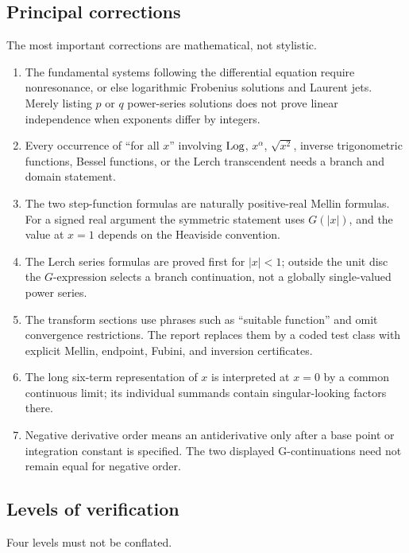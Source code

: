 \subsection{Principal corrections}

The most important corrections are mathematical, not stylistic.

\begin{enumerate}
\item The fundamental systems following the differential equation require
nonresonance, or else logarithmic Frobenius solutions and Laurent jets.  Merely
listing $p$ or $q$ power-series solutions does not prove linear independence
when exponents differ by integers.
\item Every occurrence of ``for all $x$'' involving $\operatorname{Log}$, $x^\alpha$,
$\sqrt{x^2}$, inverse trigonometric functions, Bessel functions, or the Lerch
transcendent needs a branch and domain statement.
\item The two step-function formulas are naturally positive-real Mellin
formulas.  For a signed real argument the symmetric statement uses $G(|x|)$,
and the value at $x=1$ depends on the Heaviside convention.
\item The Lerch series formulas are proved first for $|x|<1$; outside the unit
disc the $G$-expression selects a branch continuation, not a globally
single-valued power series.
\item The transform sections use phrases such as ``suitable function'' and
omit convergence restrictions.  The report replaces them by a coded test
class with explicit Mellin, endpoint, Fubini, and inversion certificates.
\item The long six-term representation of $x$ is interpreted at $x=0$ by a
common continuous limit; its individual summands contain singular-looking
factors there.
\item Negative derivative order means an antiderivative only after a base point
or integration constant is specified.  The two displayed G-continuations need
not remain equal for negative order.
\end{enumerate}

\subsection{Levels of verification}

Four levels must not be conflated.

